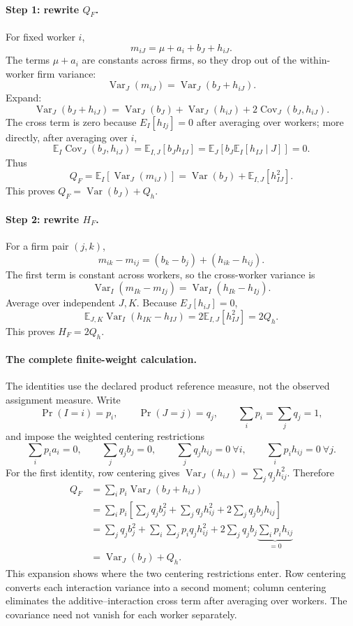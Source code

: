 \documentclass[11pt]{article}
\newcommand{\E}{\mathbb{E}}
\newcommand{\Var}{\operatorname{Var}}
\newcommand{\Cov}{\operatorname{Cov}}
\begin{document}
\paragraph{Step 1: rewrite \(Q_F\).}
For fixed worker \(i\),
\[
m_{iJ}=\mu+a_i+b_J+h_{iJ}.
\]
The terms \(\mu+a_i\) are constants across firms, so they drop out of the
within-worker firm variance:
\[
\Var_J(m_{iJ})=\Var_J(b_J+h_{iJ}).
\]
Expand:
\[
\Var_J(b_J+h_{iJ})
=
\Var_J(b_J)+\Var_J(h_{iJ})
+2\Cov_J(b_J,h_{iJ}).
\]
The cross term is zero because \(E_I[h_{Ij}]=0\) after averaging over workers;
more directly, after averaging over \(i\),
\[
\E_I\Cov_J(b_J,h_{iJ})
=
\E_{I,J}[b_J h_{IJ}]
=
\E_J\left[b_J \E_I[h_{IJ}\mid J]\right]
=0.
\]
Thus
\[
Q_F=\E_I[\Var_J(m_{iJ})]
=
\Var(b_J)+\E_{I,J}[h_{IJ}^2].
\]
This proves \(Q_F=\Var(b_J)+Q_h\).

\paragraph{Step 2: rewrite \(H_F\).}
For a firm pair \((j,k)\),
\[
m_{ik}-m_{ij}
=
(b_k-b_j)+(h_{ik}-h_{ij}).
\]
The first term is constant across workers, so the cross-worker variance is
\[
\Var_I(m_{Ik}-m_{Ij})
=
\Var_I(h_{Ik}-h_{Ij}).
\]
Average over independent \(J,K\). Because \(E_J[h_{iJ}]=0\),
\[
\E_{J,K}\Var_I(h_{IK}-h_{IJ})
=
2\E_{I,J}[h_{IJ}^2]
=
2Q_h.
\]
This proves \(H_F=2Q_h\).

\paragraph{The complete finite-weight calculation.}
The identities use the declared product reference measure, not the observed
assignment measure.  Write
\[
\Pr(I=i)=p_i,
\qquad
\Pr(J=j)=q_j,
\qquad
\sum_i p_i=\sum_j q_j=1,
\]
and impose the weighted centering restrictions
\[
\sum_i p_i a_i=0,
\qquad
\sum_j q_j b_j=0,
\qquad
\sum_j q_j h_{ij}=0\ \forall i,
\qquad
\sum_i p_i h_{ij}=0\ \forall j.
\tag{weighted-centering}
\]
For the first identity, row centering gives
\(\Var_J(h_{iJ})=\sum_jq_jh_{ij}^2\).  Therefore
\begin{align*}
Q_F
&=\sum_i p_i\Var_J(b_J+h_{iJ})\\
&=\sum_i p_i\left[
\sum_jq_jb_j^2
+\sum_jq_jh_{ij}^2
+2\sum_jq_jb_jh_{ij}
\right]\\
&=\sum_jq_jb_j^2
+\sum_i\sum_jp_iq_jh_{ij}^2
+2\sum_jq_jb_j\underbrace{\sum_ip_ih_{ij}}_{=0}\\
&=\Var_J(b_J)+Q_h.
\end{align*}
This expansion shows where the two centering restrictions enter.  Row
centering converts each interaction variance into a second moment; column
centering eliminates the additive--interaction cross term after averaging over
workers.  The covariance need not vanish for each worker separately.
\end{document}

